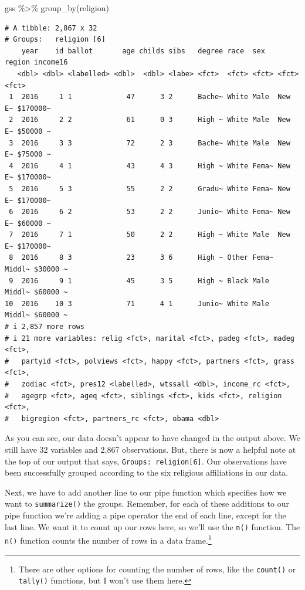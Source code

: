 \documentclass[
  letterpaper,
]{book}
\newenvironment{Shaded}{\begin{snugshade}}{\end{snugshade}}
\newcommand{\FunctionTok}[1]{\textcolor[rgb]{0.28,0.35,0.67}{#1}}
\newcommand{\NormalTok}[1]{\textcolor[rgb]{0.00,0.23,0.31}{#1}}
\newcommand{\SpecialCharTok}[1]{\textcolor[rgb]{0.37,0.37,0.37}{#1}}
\begin{document}
\begin{Shaded}
\begin{Highlighting}[]
\NormalTok{gss }\SpecialCharTok{\%\textgreater{}\%}
  \FunctionTok{group\_by}\NormalTok{(religion)}
\end{Highlighting}
\end{Shaded}

\begin{verbatim}
# A tibble: 2,867 x 32
# Groups:   religion [6]
    year    id ballot       age childs sibs   degree race  sex   region income16
   <dbl> <dbl> <labelled> <dbl>  <dbl> <labe> <fct>  <fct> <fct> <fct>  <fct>   
 1  2016     1 1             47      3 2      Bache~ White Male  New E~ $170000~
 2  2016     2 2             61      0 3      High ~ White Male  New E~ $50000 ~
 3  2016     3 3             72      2 3      Bache~ White Male  New E~ $75000 ~
 4  2016     4 1             43      4 3      High ~ White Fema~ New E~ $170000~
 5  2016     5 3             55      2 2      Gradu~ White Fema~ New E~ $170000~
 6  2016     6 2             53      2 2      Junio~ White Fema~ New E~ $60000 ~
 7  2016     7 1             50      2 2      High ~ White Male  New E~ $170000~
 8  2016     8 3             23      3 6      High ~ Other Fema~ Middl~ $30000 ~
 9  2016     9 1             45      3 5      High ~ Black Male  Middl~ $60000 ~
10  2016    10 3             71      4 1      Junio~ White Male  Middl~ $60000 ~
# i 2,857 more rows
# i 21 more variables: relig <fct>, marital <fct>, padeg <fct>, madeg <fct>,
#   partyid <fct>, polviews <fct>, happy <fct>, partners <fct>, grass <fct>,
#   zodiac <fct>, pres12 <labelled>, wtssall <dbl>, income_rc <fct>,
#   agegrp <fct>, ageq <fct>, siblings <fct>, kids <fct>, religion <fct>,
#   bigregion <fct>, partners_rc <fct>, obama <dbl>
\end{verbatim}

As you can see, our data doesn't appear to have changed in the output
above. We still have 32 variables and 2,867 observations. But, there is
now a helpful note at the top of our output that says,
\texttt{Groups:\ religion{[}6{]}}. Our observations have been
successfully grouped according to the six religious affiliations in our
data.

Next, we have to add another line to our pipe function which specifies
how we want to \texttt{summarize()} the groups. Remember, for each of
these additions to our pipe function we're adding a pipe operator the
end of each line, except for the last line. We want it to count up our
rows here, so we'll use the \texttt{n()} function. The \texttt{n()}
function counts the number of rows in a data frame.\footnote{There are
  other options for counting the number of rows, like the
  \texttt{count()} or \texttt{tally()} functions, but I won't use them
  here.}
\end{document}
